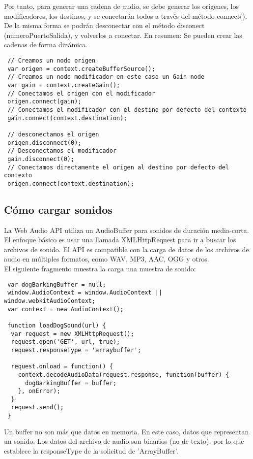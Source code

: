 Por tanto, para generar una cadena de audio, se debe generar los orígenes,  los modificadores, los destinos, y se conectarán todos a través del método connect(). De la misma forma se podrán  desconectar con el método disconect (numeroPuertoSalida), y volverlos a conectar.  En resumen:  Se pueden crear las cadenas de forma dinámica.

\begin{verbatim}
 // Creamos un nodo origen
 var origen = context.createBufferSource();
 // Creamos un nodo modificador en este caso un Gain node
 var gain = context.createGain();
 // Conectamos el origen con el modificador
 origen.connect(gain);
 // Conectamos el modificador con el destino por defecto del contexto
 gain.connect(context.destination);

 // desconectamos el origen
 origen.disconnect(0);
 // Desconectamos el modificador
 gain.disconnect(0);
 // Conectamos directamente el origen al destino por defecto del contexto
 origen.connect(context.destination);
\end{verbatim}

\subsection{Cómo cargar sonidos}
\label{sec:cargar_sonidos}
La Web Audio API utiliza un AudioBuffer para sonidos de duración media-corta. El enfoque básico es usar una llamada XMLHttpRequest para ir a buscar los archivos de sonido. 
El API es compatible con la carga de datos de los archivos de audio en múltiples formatos, como WAV, MP3, AAC, OGG y otros.\\

El siguiente fragmento muestra la carga una muestra de sonido:
\begin{verbatim}
 var dogBarkingBuffer = null;
 window.AudioContext = window.AudioContext || window.webkitAudioContext;
 var context = new AudioContext();

 function loadDogSound(url) {
  var request = new XMLHttpRequest();
  request.open('GET', url, true);
  request.responseType = 'arraybuffer';

  request.onload = function() {
    context.decodeAudioData(request.response, function(buffer) {
      dogBarkingBuffer = buffer;
    }, onError);
  }
  request.send();
 }
\end{verbatim}

Un buffer no son más que datos en memoria. En este caso, datos que representan un sonido.
Los datos del archivo de audio son binarios (no de texto), por lo que establece la responseType de la solicitud de 'ArrayBuffer'.\\

